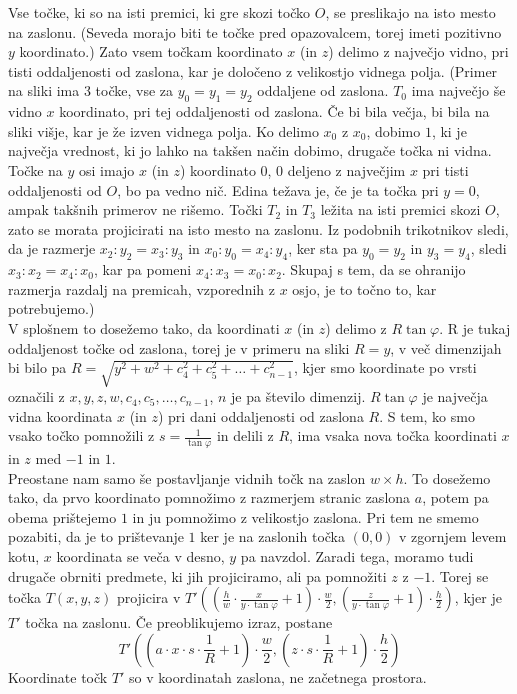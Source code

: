 \documentclass[a4paper, 12px]{article}
\begin{document}
    Vse točke, ki so na isti premici, ki gre skozi točko $O$, se preslikajo na isto mesto na zaslonu.
    (Seveda morajo biti te točke pred opazovalcem, torej imeti pozitivno $y$ koordinato.)
    Zato vsem točkam koordinato $x$ (in $z$) delimo z največjo vidno, pri tisti oddaljenosti od zaslona, kar je
    določeno z velikostjo vidnega polja.
    (Primer na sliki ima 3 točke, vse za $y_0 = y_1 = y_2$ oddaljene od zaslona. $T_0$ ima največjo še vidno $x$
    koordinato, pri tej oddaljenosti od zaslona. Če bi bila večja, bi bila na sliki višje, kar je že izven vidnega polja.
    Ko delimo $x_0$ z $x_0$, dobimo $1$, ki je največja vrednost, ki jo lahko na takšen način dobimo, drugače točka ni vidna.
    Točke na $y$ osi imajo $x$ (in $z$) koordinato $0$, $0$ deljeno z največjim $x$ pri tisti oddaljenosti od $O$, 
    bo pa vedno nič. Edina težava je, če je ta točka pri $y = 0$, ampak takšnih primerov ne rišemo.
    Točki $T_2$ in $T_3$ ležita na isti premici skozi $O$, zato se morata projicirati na isto mesto na zaslonu.
    Iz podobnih trikotnikov sledi, da je razmerje $x_2 : y_2 = x_3 : y_3$ in $x_0 : y_0 = x_4 : y_4$,
    ker sta pa $y_0 = y_2$ in $y_3 = y_4$, sledi $x_3 : x_2 = x_4 : x_0$, kar pa pomeni $x_4 : x_3 = x_0 : x_2$.
    Skupaj s tem, da se ohranijo razmerja razdalj na premicah, vzporednih z $x$ osjo, je to točno to, kar potrebujemo.)\\

    V splošnem to dosežemo tako, da koordinati $x$ (in $z$) delimo z $R\tan{\varphi}$. R je tukaj oddaljenost točke od zaslona,
    torej je v primeru na sliki $R = y$, v več dimenzijah bi bilo pa $R = \sqrt{y^2 + w^2 + c_4^2 + c_5^2 + \dots + c_{n-1}^2}$,
    kjer smo koordinate po vrsti označili z $x, y, z, w, c_4, c_5, \dots, c_{n-1}$, $n$ je pa število dimenzij.
    $R\tan{\varphi}$ je največja vidna koordinata $x$ (in $z$) pri dani oddaljenosti od zaslona $R$.
    S tem, ko smo vsako točko pomnožili z $s = \frac{1}{\tan{\varphi}}$ in delili z $R$, ima vsaka nova točka koordinati $x$ in $z$ med $-1$ in $1$. \\

    Preostane nam samo še postavljanje vidnih točk na zaslon $w \times h$. To dosežemo tako, da prvo koordinato pomnožimo
    z razmerjem stranic zaslona $a$, potem pa obema prištejemo $1$ in ju pomnožimo z velikostjo zaslona. Pri tem ne smemo
    pozabiti, da je to prištevanje $1$ ker je na zaslonih točka $\left(0, 0\right)$ v zgornjem levem kotu, $x$ koordinata
    se veča v desno, $y$ pa navzdol. Zaradi tega, moramo tudi drugače obrniti predmete, ki jih projiciramo, ali pa pomnožiti
    $z$ z $-1$. Torej se točka $T\left(x, y, z\right)$ projicira v 
    $T'\left(\left(\frac{h}{w} \cdot \frac{x}{y \cdot \tan{\varphi}} + 1\right) \cdot \frac{w}{2},
    \left(\frac{z}{y \cdot \tan{\varphi}} + 1\right) \cdot \frac{h}{2} \right)$, 
    kjer je $T'$ točka na zaslonu. Če preoblikujemo izraz, postane 
    $$T'\left(\left(a \cdot x \cdot s \cdot \frac{1}{R} + 1\right) \cdot \frac{w}{2},
    \left(z \cdot s \cdot \frac{1}{R} + 1\right) \cdot \frac{h}{2} \right)$$
    Koordinate točk $T'$ so v koordinatah zaslona, ne začetnega prostora.
    \cite{ProjectionVideo}
\end{document}
